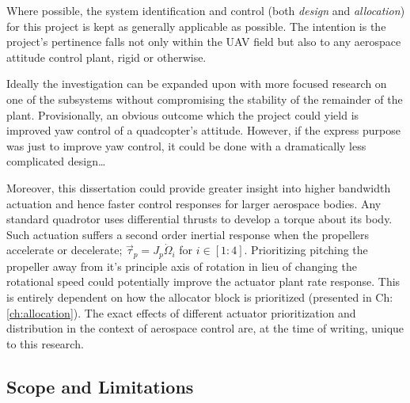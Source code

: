 \par
Where possible, the system identification and control (both \emph{design} and \emph{allocation}) for this project is kept as generally applicable as possible. The intention is the project's pertinence falls not only within the UAV field but also to any aerospace attitude control plant, rigid or otherwise. 
\par
Ideally the investigation can be expanded upon with more focused research on one of the subsystems without compromising the stability of the remainder of the plant. Provisionally, an obvious outcome which the project could yield is improved yaw control of a quadcopter's attitude. However, if the express purpose was just to improve yaw control, it could be done with a dramatically less complicated design\ldots
\par
Moreover, this dissertation could provide greater insight into higher bandwidth actuation and hence faster control responses for larger aerospace bodies. Any standard quadrotor uses differential thrusts to develop a torque about its body. Such actuation suffers a second order inertial response when the propellers accelerate or decelerate; $\vec{\tau}_{p}=J_p\dot{\Omega}_i$ for $i\in[1:4]$. Prioritizing pitching the propeller away from it's principle axis of rotation in lieu of changing the rotational speed could potentially improve the actuator plant rate response. This is entirely dependent on how the allocator block is prioritized (presented in Ch:\ref{ch:allocation}). The exact effects of different actuator prioritization and distribution in the context of aerospace control are, at the time of writing, unique to this research.
\subsection{Scope and Limitations}
\label{subsec:intro.foreword.scopeandlim}
